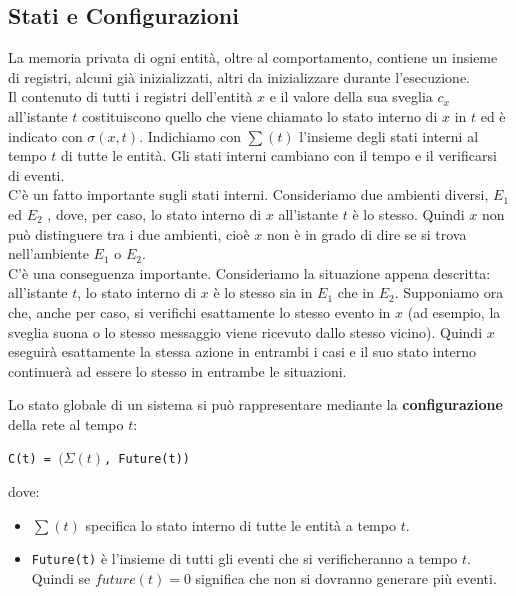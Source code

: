 \subsection{Stati e Configurazioni}
La memoria privata di ogni entità, oltre al comportamento, contiene un insieme di registri, alcuni già inizializzati, altri da inizializzare durante l'esecuzione.\\
Il contenuto di tutti i registri dell'entità $x$ e il valore della sua sveglia $c_x$ all'istante $t$ costituiscono quello che viene chiamato lo stato interno di $x$ in $t$ ed è indicato con $\sigma (x, t)$. Indichiamo con $\sum(t)$ l'insieme degli stati interni al tempo $t$ di tutte le entità. Gli stati interni cambiano con il tempo e il verificarsi di eventi.\\
C'è un fatto importante sugli stati interni. Consideriamo due ambienti diversi, $E_1$ ed $E_2$ , dove, per caso, lo stato interno di $x$ all'istante $t$ è lo stesso. Quindi $x$ non può distinguere tra i due ambienti, cioè $x$ non è in grado di dire se si trova nell'ambiente $E_1$ o $E_2$.\\
C'è una conseguenza importante. Consideriamo la situazione appena descritta: all'istante $t$, lo stato interno di $x$ è lo stesso sia in $E_1$ che in $E_2$. Supponiamo ora che, anche per caso, si verifichi esattamente lo stesso evento in $x$ (ad esempio, la sveglia suona o lo stesso messaggio viene ricevuto dallo stesso vicino). Quindi $x$ eseguirà esattamente la stessa azione in entrambi i casi e il suo stato interno continuerà ad essere lo stesso in entrambe le situazioni.



Lo stato globale di un sistema si può rappresentare mediante la \textbf{configurazione} della rete al tempo $t$:
\begin{center}
  \texttt{C(t) = $(\Sigma(t)$, \texttt{Future(t)})}
\end{center}
dove:
\begin{itemize}
    \item $\sum(t)$ specifica lo stato interno di tutte le entità a tempo $t$.
    \item \texttt{Future(t)} è l'insieme di tutti gli eventi che si verificheranno a tempo $t$. Quindi se $future(t) = 0$ significa che non si dovranno generare più eventi.
\end{itemize}

